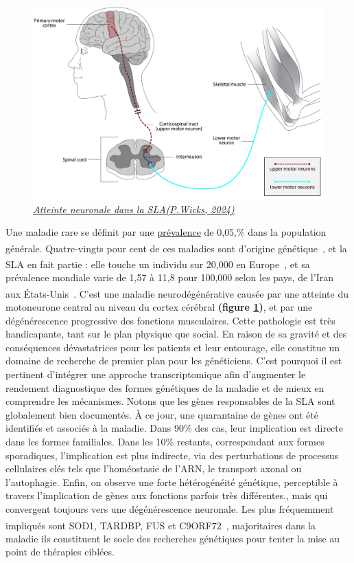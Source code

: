 \begin{figure} 
    \centering
    \includegraphics[width=1\linewidth]{Cortex_Spinal.jpg}
    \caption{\scriptsize{\textit{\underline{Atteinte neuronale dans la SLA(P.Wicks, 2024)}}}}
    \label{fig:Cortex}
\end{figure}

Une maladie rare se définit par une \hyperref[def:prevalence]{prévalence} de 0{,}05,\% dans la population générale.
 Quatre-vingts pour cent de ces maladies sont d’origine génétique~\textsuperscript{\cite{centre_constitutif_sla_de_tours_protocole_2020}},
 et la SLA en fait partie : elle touche un individu sur 20,000 en Europe~\textsuperscript{\cite{orphanet_prevalence_2023}},
  et sa prévalence mondiale varie de 1{,}57 à 11{,}8 pour 100,000 selon les pays, de l’Iran aux États-Unis~\textsuperscript{\cite{c_wolfson_et_al_global_2023}}.
C’est une maladie neurodégénérative causée par une atteinte du motoneurone central au niveau du cortex cérébral \textbf{(figure \ref{fig:Cortex})},
 et par une dégénérescence progressive des fonctions musculaires. Cette pathologie est très handicapante, tant sur le plan physique que social.
  En raison de sa gravité et des conséquences dévastatrices pour les patients et leur entourage, elle constitue un domaine de recherche de premier plan pour les généticiens. 
  C’est pourquoi il est pertinent d’intégrer une approche transcriptomique afin d’augmenter le rendement diagnostique des formes génétiques de la maladie et de mieux en comprendre les mécanismes.
Notons que les gènes responsables de la SLA sont globalement bien documentés. À ce jour, une quarantaine de gènes ont été identifiés et associés à la maladie. Dans 90\%
 des cas, leur implication est directe dans les formes familiales. Dans les 10\% restants, correspondant aux formes sporadiques, l’implication est plus indirecte, 
 via des perturbations de processus cellulaires clés tels que l’homéostasie de l’ARN, le transport axonal ou l’autophagie.
Enfin, on observe une forte hétérogénéité génétique, perceptible à travers l’implication de gènes aux fonctions parfois très différentes.,
 mais qui convergent toujours vers une dégénérescence neuronale. Les plus fréquemment impliqués sont  SOD1, TARDBP, FUS et C9ORF72~\textsuperscript{\cite{centre_constitutif_sla_de_tours_protocole_2020}},
  majoritaires dans la maladie ils constituent le socle des recherches génétiques pour tenter la mise au point de thérapies ciblées.

